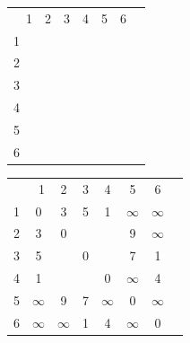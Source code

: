 \documentclass[10pt,a4paper,spanish]{report}
\theoremstyle{definition}
\theoremstyle{remark}
\begin{document}
\begin{minipage}{0.5\textwidth}
\begin{center}
\begin{tabular}{c|c|c|c|c|c|c|c|}
\multicolumn{2}{r}{1} & \multicolumn{1}{c}{2} & \multicolumn{1}{c}{3} & \multicolumn{1}{c}{4} & \multicolumn{1}{c}{5} & \multicolumn{1}{c}{6} \\ 
\cline{2-7}
1 & & & & & & \\
\cline{2-7} 
2 & & &\cellcolor{Black}{\textcolor{White}{1}}&\cellcolor{Black}{\textcolor{White}{1}}& & \\
\cline{2-7} 
3 & &\cellcolor{Black}{\textcolor{White}{1}}& &\cellcolor{Black}{\textcolor{White}{1}}& & \\
\cline{2-7} 
4 & &\cellcolor{Black}{\textcolor{White}{1}}&\cellcolor{Black}{\textcolor{White}{1}}& & & \\
\cline{2-7} 
5 & & & & & & \\
\cline{2-7} 
6 & & & & & & \\
\cline{2-7} 
\end{tabular}
\end{center}
\end{minipage}
\begin{minipage}{0.5\textwidth}
\begin{center}
\begin{tabular}{c|c|c|c|c|c|c|c|}
\multicolumn{2}{r}{1} & \multicolumn{1}{c}{2} & \multicolumn{1}{c}{3} & \multicolumn{1}{c}{4} & \multicolumn{1}{c}{5} & \multicolumn{1}{c}{6} \\ 
\cline{2-7}
1 & 0 & 3 & 5 & 1 & $\infty$ & $\infty$ \\
\cline{2-7} 
2 & 3 & 0 & \cellcolor{Black}{\textcolor{White}{8}} & \cellcolor{Black}{\textcolor{White}{4}} & 9 & $\infty$ \\
\cline{2-7} 
3 & 5 & \cellcolor{Black}{\textcolor{White}{8}} & 0 & \cellcolor{Black}{\textcolor{White}{6}} & 7 & 1 \\
\cline{2-7} 
4 & 1 & \cellcolor{Black}{\textcolor{White}{4}} & \cellcolor{Black}{\textcolor{White}{6}} & 0 & $\infty$ & 4 \\
\cline{2-7} 
5 & $\infty$ & 9 & 7 & $\infty$ & 0 & $\infty$ \\
\cline{2-7} 
6 & $\infty$ & $\infty$ & 1 & 4 & $\infty$ & 0 \\
\cline{2-7} 
\end{tabular}
\end{center}
\end{minipage}
\end{document}
